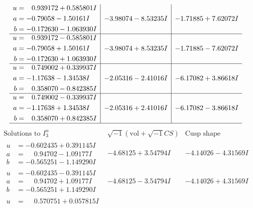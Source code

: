 \documentclass[1p]{elsarticle_modified}
\theoremstyle{definition}
\newcommand{\I}{\sqrt{-1}}
\begin{document}
$$\begin{array}{c|c|c}
\begin{aligned}
u &= \phantom{-}0.939172 + 0.585801 I \\
a &= -0.79058 - 1.50161 I \\
b &= -0.172630 - 1.063930 I\end{aligned}
 & -3.98074 - 8.53235 I & -1.71885 + 7.62072 I \\ \hline\begin{aligned}
u &= \phantom{-}0.939172 - 0.585801 I \\
a &= -0.79058 + 1.50161 I \\
b &= -0.172630 + 1.063930 I\end{aligned}
 & -3.98074 + 8.53235 I & -1.71885 - 7.62072 I \\ \hline\begin{aligned}
u &= \phantom{-}0.749002 + 0.339937 I \\
a &= -1.17638 - 1.34538 I \\
b &= \phantom{-}0.358070 - 0.842385 I\end{aligned}
 & -2.05316 - 2.41016 I & -6.17082 + 3.86618 I \\ \hline\begin{aligned}
u &= \phantom{-}0.749002 - 0.339937 I \\
a &= -1.17638 + 1.34538 I \\
b &= \phantom{-}0.358070 + 0.842385 I\end{aligned}
 & -2.05316 + 2.41016 I & -6.17082 - 3.86618 I\\
 \hline 
 \end{array}$$\newpage$$\begin{array}{c|c|c}  
\text{Solutions to }I^u_{3}& \I (\text{vol} + \sqrt{-1}CS) & \text{Cusp shape}\\
 \hline 
\begin{aligned}
u &= -0.602435 + 0.391145 I \\
a &= \phantom{-}0.94702 - 1.09177 I \\
b &= -0.565251 - 1.149290 I\end{aligned}
 & -4.68125 + 3.54794 I & -4.14026 - 4.31569 I \\ \hline\begin{aligned}
u &= -0.602435 - 0.391145 I \\
a &= \phantom{-}0.94702 + 1.09177 I \\
b &= -0.565251 + 1.149290 I\end{aligned}
 & -4.68125 - 3.54794 I & -4.14026 + 4.31569 I \\ \hline\begin{aligned}
u &= \phantom{-}0.570751 + 0.057815 I \\

\end{aligned}
\end{array}$$
\end{document}
